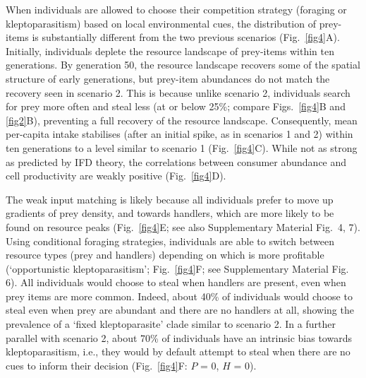 \begin{refsection}[sorting=nyt]
When individuals are allowed to choose their competition strategy (foraging or kleptoparasitism) based on local environmental cues, the distribution of prey-items is substantially different from the two previous scenarios (Fig.~\ref{fig4}A).
Initially, individuals deplete the resource landscape of prey-items within ten generations.
By generation 50, the resource landscape recovers some of the spatial structure of early generations, but prey-item abundances do not match the recovery seen in scenario 2.
This is because unlike scenario 2, individuals search for prey more often and steal less (at or below 25\%; compare Figs.~\ref{fig4}B and \ref{fig2}B), preventing a full recovery of the resource landscape.
Consequently, mean per-capita intake stabilises (after an initial spike, as in scenarios 1 and 2) within ten generations to a level similar to scenario 1 (Fig.~\ref{fig4}C).
While not as strong as predicted by IFD theory, the correlations between consumer abundance and cell productivity are weakly positive (Fig.~\ref{fig4}D).

The weak input matching is likely because all individuals prefer to move up gradients of prey density, and towards handlers, which are more likely to be found on resource peaks (Fig.~\ref{fig4}E; see also Supplementary Material Fig.~4, 7).
Using conditional foraging strategies, individuals are able to switch between resource types (prey and handlers) depending on which is more profitable \citep{emlen1966} (`opportunistic kleptoparasitism'; Fig.~\ref{fig4}F; see Supplementary Material Fig. 6).
All individuals would choose to steal when handlers are present, even when prey items are more common.
Indeed, about 40\% of individuals would choose to steal even when prey are abundant and there are no handlers at all, showing the prevalence of a `fixed kleptoparasite' clade similar to scenario 2.
In a further parallel with scenario 2, about 70\% of individuals have an intrinsic bias towards kleptoparasitism, i.e., they would by default attempt to steal when there are no cues to inform their decision (Fig.~\ref{fig4}F: $P$ = 0, $H$ = 0).


\end{refsection}
